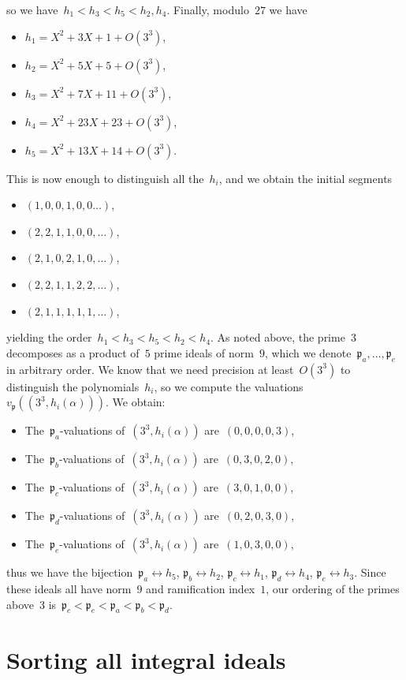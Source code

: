 \documentclass{article}
\def\p{{\mathfrak p}}
\begin{document}
so we have~$h_1<h_3<h_5<h_2,h_4$. Finally, modulo~$27$ we have
\begin{itemize}
  \item $h_1 = X^2 + 3X + 1 + O(3^3)$,
  \item $h_2 = X^2 + 5X + 5 + O(3^3)$,
  \item $h_3 = X^2 + 7X + 11 + O(3^3)$,
  \item $h_4 = X^2 + 23X + 23 + O(3^3)$,
  \item $h_5 = X^2 + 13X + 14 + O(3^3)$.
\end{itemize}
This is now enough to distinguish all the~$h_i$, and we obtain the initial segments
\begin{itemize}
  \item $(1,0,0,1,0,0\dots)$,
  \item $(2,2,1,1,0,0,\dots)$,
  \item $(2,1,0,2,1,0,\dots)$,
  \item $(2,2,1,1,2,2,\dots)$,
  \item $(2,1,1,1,1,1,\dots)$,
\end{itemize}
yielding the order~$h_1 < h_3 < h_5 < h_2 < h_4$.
As noted above, the prime~$3$ decomposes as a product of~$5$ prime ideals of norm~$9$,
which we denote~$\p_a, \dots, \p_e$ in arbitrary order. We know that we need
precision at least~$O(3^3)$ to distinguish the polynomials~$h_i$, so we compute
the valuations~$v_\p((3^3,h_i(\alpha)))$. We obtain:
\begin{itemize}
  \item The~$\p_a$-valuations of~$(3^3,h_i(\alpha))$ are~$(0,0,0,0,3)$,
  \item The~$\p_b$-valuations of~$(3^3,h_i(\alpha))$ are~$(0,3,0,2,0)$,
  \item The~$\p_c$-valuations of~$(3^3,h_i(\alpha))$ are~$(3,0,1,0,0)$,
  \item The~$\p_d$-valuations of~$(3^3,h_i(\alpha))$ are~$(0,2,0,3,0)$,
  \item The~$\p_e$-valuations of~$(3^3,h_i(\alpha))$ are~$(1,0,3,0,0)$,
\end{itemize}
thus we have the bijection~$\p_a\leftrightarrow h_5$, $\p_b\leftrightarrow h_2$,
$\p_c\leftrightarrow h_1$, $\p_d\leftrightarrow h_4$, $\p_e\leftrightarrow h_3$.
Since these ideals all have norm~$9$ and ramification index~$1$, our ordering of
the primes above~$3$ is~$\p_c < \p_e < \p_a < \p_b < \p_d$.

\section{Sorting all integral ideals}
\end{document}
